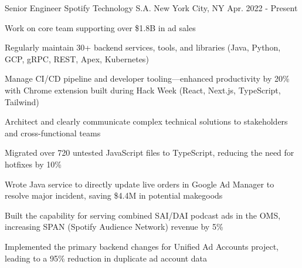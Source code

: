 

\begin{cventries}

  \cventry
    {Senior Engineer} %
    {Spotify Technology S.A.} %
    {New York City, NY} %
    {Apr. 2022 - Present} %
    {
      \begin{cvitems} 
        \item {Work on core team supporting over \$1.8B in ad sales}
        \item {Regularly maintain 30+ backend services, tools, and libraries (Java, Python, GCP, gRPC, REST, Apex, Kubernetes)}
        \item {Manage CI/CD pipeline and developer tooling---enhanced productivity by 20\% with Chrome extension built during Hack Week (React, Next.js, TypeScript, Tailwind)}
        \item {Architect and clearly communicate complex technical solutions to stakeholders and cross-functional teams}
        \item {Migrated over 720 untested JavaScript files to TypeScript, reducing the need for hotfixes by 10\%}
        \item {Wrote Java service to directly update live orders in Google Ad Manager to resolve major incident, saving \$4.4M in potential makegoods}
        \item {Built the capability for serving combined SAI/DAI podcast ads in the OMS, increasing SPAN (Spotify Audience Network) revenue by 5\%}
        \item {Implemented the primary backend changes for Unified Ad Accounts project, leading to a 95\% reduction in duplicate ad account data}
      \end{cvitems}
    }


\end{cventries}
